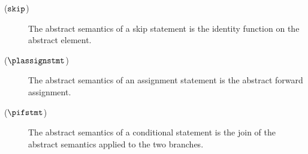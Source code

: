 \begin{description}
  \item[\normalfont ($\textup{\texttt{skip}}$)] The abstract semantics of a skip statement is the identity function on the abstract element.
  \item[\normalfont ($\plassignstmt$)] The abstract semantics of an assignment statement is the abstract forward assignment.
  \item[\normalfont ($\pifstmt$)] The abstract semantics of a conditional statement is the join of the abstract semantics applied to the two branches.


\end{description}
